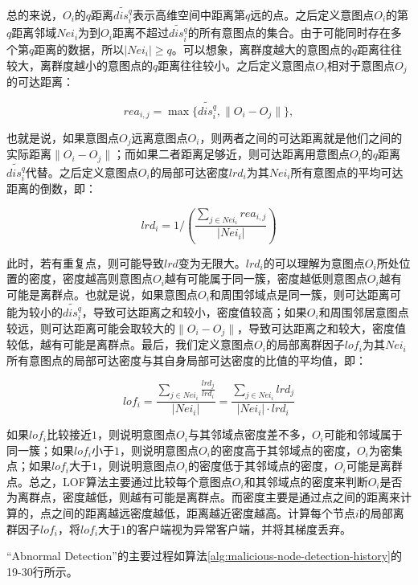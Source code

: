 \documentclass[lettersize,journal]{IEEEtran}
\begin{document}
\begin{enumerate}
总的来说，$O_i$的$q$距离$\widetilde{dis_i^q}$表示高维空间中距离第$q$远的点。之后定义意图点$O_i$的第$q$距离邻域$Nei_i$为到$O_i$距离不超过$\widetilde{dis_i^q}$的所有意图点的集合。由于可能同时存在多个第$q$距离的数据，所以$|Nei_i|\geq q$。可以想象，离群度越大的意图点的$q$距离往往较大，离群度越小的意图点的$q$距离往往较小。之后定义意图点$O_i$相对于意图点$O_j$的可达距离：

\begin{equation}
rea_{i,j}=\max\{\widetilde{dis_i^q}, \|O_i-O_j\|\},
\end{equation}

也就是说，如果意图点$O_j$远离意图点$O_i$，则两者之间的可达距离就是他们之间的实际距离$\|O_i-O_j\|$；而如果二者距离足够近，则可达距离用意图点$O_i$的$q$距离$\widetilde{dis_i^q}$代替。之后定义意图点$O_i$的局部可达密度$lrd_i$为其$Nei_i$所有意图点的平均可达距离的倒数，即：

\begin{equation}
lrd_i=1/(\frac{\sum_{j\in Nei_i} rea_{i,j}}{|Nei_i|})
\end{equation}

此时，若有重复点，则可能导致$lrd$变为无限大。$lrd_i$的可以理解为意图点$O_i$所处位置的密度，密度越高则意图点$O_i$越有可能属于同一簇，密度越低则意图点$O_i$越有可能是离群点。也就是说，如果意图点$O_i$和周围邻域点是同一簇，则可达距离可能为较小的$\widetilde{dis_i^q}$，导致可达距离之和较小，密度值较高；如果$O_i$和周围邻居意图点较远，则可达距离可能会取较大的$\|O_i-O_j\|$，导致可达距离之和较大，密度值较低，越有可能是离群点。最后，我们定义意图点$O_i$的局部离群因子$lof_i$为其$Nei_i$所有意图点的局部可达密度与其自身局部可达密度的比值的平均值，即：

\begin{equation}
    lof_i=\frac{\sum_{j\in Nei_i}\frac{lrd_j}{lrd_i}}{|Nei_i|}=\frac{\sum_{j\in Nei_i} lrd_j}{|Nei_i|\cdot lrd_i}
\end{equation}

如果$lof_i$比较接近$1$，则说明意图点$O_i$与其邻域点密度差不多，$O_i$可能和邻域属于同一簇；如果$lof_i$小于$1$，则说明意图点$O_i$的密度高于其邻域点的密度，$O_i$为密集点；如果$lof_i$大于$1$，则说明意图点$O_i$的密度低于其邻域点的密度，$O_i$可能是离群点。总之，LOF算法主要通过比较每个意图点$O_i$和其邻域点的密度来判断$O_i$是否为离群点，密度越低，则越有可能是离群点。而密度主要是通过点之间的距离来计算的，点之间的距离越远密度越低，距离越近密度越高。计算每个节点$i$的局部离群因子$lof_i$，将$lof_i$大于$1$的客户端视为异常客户端，并将其梯度丢弃。

“Abnormal Detection”的主要过程如算法\ref{alg:malicious-node-detection-history}的19-30行所示。


\end{enumerate}
\end{document}
